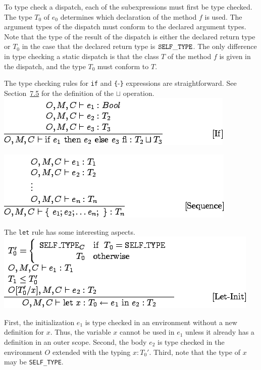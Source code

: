 \documentclass[]{article}
\begin{document}
To type check a dispatch, each of the subexpressions must first be type
checked. The type $T_0$ of $e_0$ determines which declaration of the
method $f$ is used. The argument types of the dispatch must conform to
the declared argument types. Note that the type of the result of the
dispatch is either the declared return type or $T_0$ in the case that
the declared return type is $\tt SELF\_TYPE$. The only difference in
type checking a static dispatch is that the class $ T$ of the method $f$
is given in the dispatch, and the type $T_0$ must conform to $ T$.

The type checking rules for \texttt{if} and \texttt{\{}-\texttt{\}}
expressions are straightforward. See
Section~\href{node18.html\#sec-cond}{7.5} for the definition of the
$\sqcup$ operation. \\

\includegraphics{img88.png}

\includegraphics{img89.png}

The \texttt{let} rule has some interesting aspects. \\

\includegraphics{img90.png}

First, the initialization $e_1$ is type checked in an environment
without a new definition for $x$. Thus, the variable $x$ cannot be used
in $e_1$ unless it already has a definition in an outer scope. Second,
the body $e_2$ is type checked in the environment $O$ extended with the
typing $x:T_0'$. Third, note that the type of $x$ may be
\texttt{SELF\_TYPE}.
\end{document}
